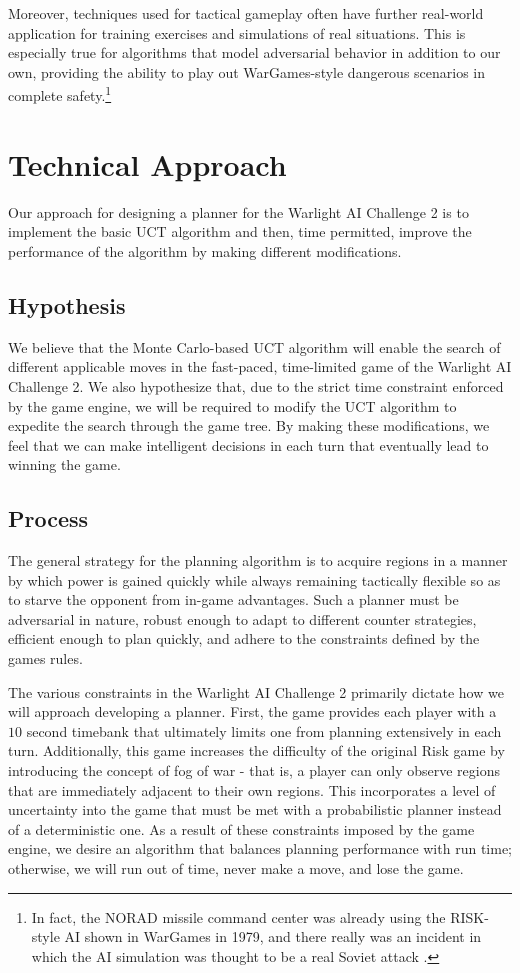\documentclass[a4paper,11pt]{article}
\begin{document}
Moreover, techniques used for tactical gameplay often have further real-world 
application for training exercises and simulations of real situations.  This is 
especially true for algorithms that model adversarial behavior in addition to our 
own, providing the ability to play out WarGames-style dangerous scenarios in 
complete safety.\footnote{In fact, the NORAD missile command center was already 
using the RISK-style AI shown in WarGames in 1979, and there really was an incident
in which the AI simulation was thought to be a real Soviet attack
\cite{wargamesreal}.}

%
\section{Technical Approach}\label{sec:approach}
Our approach for designing a planner for the Warlight AI Challenge 2 is to implement the basic UCT algorithm and then, time permitted, improve the performance of the algorithm by making different modifications.


\subsection{Hypothesis}\label{sec:hypothesis}
We believe that the Monte Carlo-based UCT algorithm will enable the search of different applicable moves in the fast-paced, time-limited game of the Warlight AI Challenge 2. We also hypothesize that, due to the strict time constraint enforced by the game engine, we will be required to modify the UCT algorithm to expedite the search through the game tree.  By making these modifications, we feel that we can make intelligent decisions in each turn that eventually lead to winning the game.

\subsection{Process}\label{sec:process}
The general strategy for the planning algorithm is to acquire regions in a manner by which power is gained quickly while always remaining tactically flexible so as to starve the opponent from in-game advantages. Such a planner must be adversarial in nature, robust enough to adapt to different counter strategies, efficient enough to plan quickly, and adhere to the constraints defined by the games rules.

The various constraints in the Warlight AI Challenge 2 primarily dictate how we will approach developing a planner. First, the game provides each player with a $10$ second timebank that ultimately limits one from planning extensively in each turn.  Additionally, this game increases the difficulty of the original Risk game by introducing the concept of fog of war - that is, a player can only observe regions that are immediately adjacent to their own regions. This incorporates a level of uncertainty into the game that must be met with a probabilistic planner instead of a deterministic one. As a result of these constraints imposed by the game engine, we desire an algorithm that balances planning performance with run time; otherwise, we will run out of time, never make a move, and lose the game. 
\end{document}
